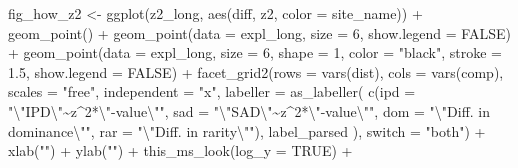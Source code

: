 \documentclass[
  letterpaper,
  DIV=11,
  numbers=noendperiod]{scrartcl}
\newenvironment{Shaded}{\begin{snugshade}}{\end{snugshade}}
\newcommand{\AttributeTok}[1]{\textcolor[rgb]{0.40,0.45,0.13}{#1}}
\newcommand{\ConstantTok}[1]{\textcolor[rgb]{0.56,0.35,0.01}{#1}}
\newcommand{\DecValTok}[1]{\textcolor[rgb]{0.68,0.00,0.00}{#1}}
\newcommand{\FloatTok}[1]{\textcolor[rgb]{0.68,0.00,0.00}{#1}}
\newcommand{\FunctionTok}[1]{\textcolor[rgb]{0.28,0.35,0.67}{#1}}
\newcommand{\NormalTok}[1]{\textcolor[rgb]{0.00,0.23,0.31}{#1}}
\newcommand{\OtherTok}[1]{\textcolor[rgb]{0.00,0.23,0.31}{#1}}
\newcommand{\SpecialCharTok}[1]{\textcolor[rgb]{0.37,0.37,0.37}{#1}}
\newcommand{\StringTok}[1]{\textcolor[rgb]{0.13,0.47,0.30}{#1}}
\begin{document}
\begin{Shaded}
\begin{Highlighting}[]
\NormalTok{fig\_how\_z2 }\OtherTok{\textless{}{-}} \FunctionTok{ggplot}\NormalTok{(z2\_long, }\FunctionTok{aes}\NormalTok{(diff, z2, }\AttributeTok{color =}\NormalTok{ site\_name)) }\SpecialCharTok{+}
    \FunctionTok{geom\_point}\NormalTok{() }\SpecialCharTok{+}
    \FunctionTok{geom\_point}\NormalTok{(}\AttributeTok{data =}\NormalTok{ expl\_long, }\AttributeTok{size =} \DecValTok{6}\NormalTok{, }\AttributeTok{show.legend =} \ConstantTok{FALSE}\NormalTok{) }\SpecialCharTok{+}
    \FunctionTok{geom\_point}\NormalTok{(}\AttributeTok{data =}\NormalTok{ expl\_long, }\AttributeTok{size =} \DecValTok{6}\NormalTok{, }\AttributeTok{shape =} \DecValTok{1}\NormalTok{, }\AttributeTok{color =} \StringTok{"black"}\NormalTok{,}
               \AttributeTok{stroke =} \FloatTok{1.5}\NormalTok{, }\AttributeTok{show.legend =} \ConstantTok{FALSE}\NormalTok{) }\SpecialCharTok{+}
    \FunctionTok{facet\_grid2}\NormalTok{(}\AttributeTok{rows =} \FunctionTok{vars}\NormalTok{(dist), }\AttributeTok{cols =} \FunctionTok{vars}\NormalTok{(comp), }
                \AttributeTok{scales =} \StringTok{"free"}\NormalTok{, }\AttributeTok{independent =} \StringTok{"x"}\NormalTok{, }
                \AttributeTok{labeller =} \FunctionTok{as\_labeller}\NormalTok{(}
                    \FunctionTok{c}\NormalTok{(}\AttributeTok{ipd =} \StringTok{"}\SpecialCharTok{\textbackslash{}"}\StringTok{IPD}\SpecialCharTok{\textbackslash{}"}\StringTok{\textasciitilde{}z\^{}2*}\SpecialCharTok{\textbackslash{}"}\StringTok{{-}value}\SpecialCharTok{\textbackslash{}"}\StringTok{"}\NormalTok{, }
                      \AttributeTok{sad =} \StringTok{"}\SpecialCharTok{\textbackslash{}"}\StringTok{SAD}\SpecialCharTok{\textbackslash{}"}\StringTok{\textasciitilde{}z\^{}2*}\SpecialCharTok{\textbackslash{}"}\StringTok{{-}value}\SpecialCharTok{\textbackslash{}"}\StringTok{"}\NormalTok{, }
                      \AttributeTok{dom =} \StringTok{"}\SpecialCharTok{\textbackslash{}"}\StringTok{Diff. in dominance}\SpecialCharTok{\textbackslash{}"}\StringTok{"}\NormalTok{, }
                      \AttributeTok{rar =} \StringTok{"}\SpecialCharTok{\textbackslash{}"}\StringTok{Diff. in rarity}\SpecialCharTok{\textbackslash{}"}\StringTok{"}\NormalTok{),}
\NormalTok{                    label\_parsed}
\NormalTok{                ), }
                \AttributeTok{switch =} \StringTok{"both"}\NormalTok{) }\SpecialCharTok{+}
    \FunctionTok{xlab}\NormalTok{(}\StringTok{""}\NormalTok{) }\SpecialCharTok{+}
    \FunctionTok{ylab}\NormalTok{(}\StringTok{""}\NormalTok{) }\SpecialCharTok{+}
    \FunctionTok{this\_ms\_look}\NormalTok{(}\AttributeTok{log\_y =} \ConstantTok{TRUE}\NormalTok{) }\SpecialCharTok{+}

\end{Highlighting}
\end{Shaded}
\end{document}
